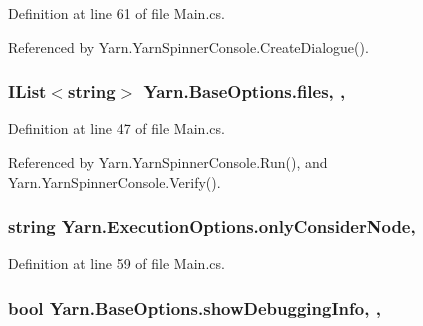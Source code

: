 Definition at line 61 of file Main.\-cs.



Referenced by Yarn.\-Yarn\-Spinner\-Console.\-Create\-Dialogue().

\hypertarget{a00031_aa93cbb1bc1d5328e0a417012621e92d2}{
\subsubsection[{files}]{\setlength{\rightskip}{0pt plus 5cm}I\-List$<$string$>$ Yarn.\-Base\-Options.\-files\hspace{0.3cm}{\ttfamily [get]}, {\ttfamily [set]}, {\ttfamily [inherited]}}}\label{a00031_aa93cbb1bc1d5328e0a417012621e92d2}


Definition at line 47 of file Main.\-cs.



Referenced by Yarn.\-Yarn\-Spinner\-Console.\-Run(), and Yarn.\-Yarn\-Spinner\-Console.\-Verify().

\hypertarget{a00093_af4c0062a1d46281d377f87084fde374e}{
\subsubsection[{only\-Consider\-Node}]{\setlength{\rightskip}{0pt plus 5cm}string Yarn.\-Execution\-Options.\-only\-Consider\-Node\hspace{0.3cm}{\ttfamily [get]}, {\ttfamily [set]}}}\label{a00093_af4c0062a1d46281d377f87084fde374e}


Definition at line 59 of file Main.\-cs.

\hypertarget{a00031_a89964ea17bd19caf00cb5bff563ed01c}{
\subsubsection[{show\-Debugging\-Info}]{\setlength{\rightskip}{0pt plus 5cm}bool Yarn.\-Base\-Options.\-show\-Debugging\-Info\hspace{0.3cm}{\ttfamily [get]}, {\ttfamily [set]}, {\ttfamily [inherited]}}}\label{a00031_a89964ea17bd19caf00cb5bff563ed01c}



